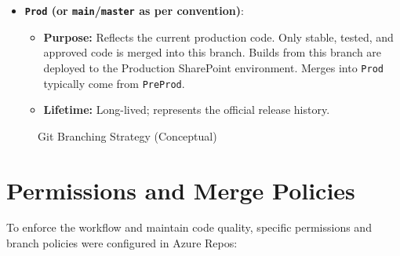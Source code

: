 \begin{itemize}
\begin{itemize}
    \end{itemize}
    \item \textbf{\texttt{Prod} (or \texttt{main}/\texttt{master} as per convention)}:
    \begin{itemize}
        \item \textbf{Purpose:} Reflects the current production code. Only stable, tested, and approved code is merged into this branch. Builds from this branch are deployed to the Production SharePoint environment. Merges into \texttt{Prod} typically come from \texttt{PreProd}.
        \item \textbf{Lifetime:} Long-lived; represents the official release history.
    \end{itemize}
\end{itemize}

\begin{figure}[htbp]
    \centering
    \caption{Git Branching Strategy (Conceptual)}
    \label{fig:GitBranchingStrategy}
\end{figure}

\section{Permissions and Merge Policies}
\label{sec:PermissionsMergePolicies}

To enforce the workflow and maintain code quality, specific permissions and branch policies were configured in Azure Repos:

